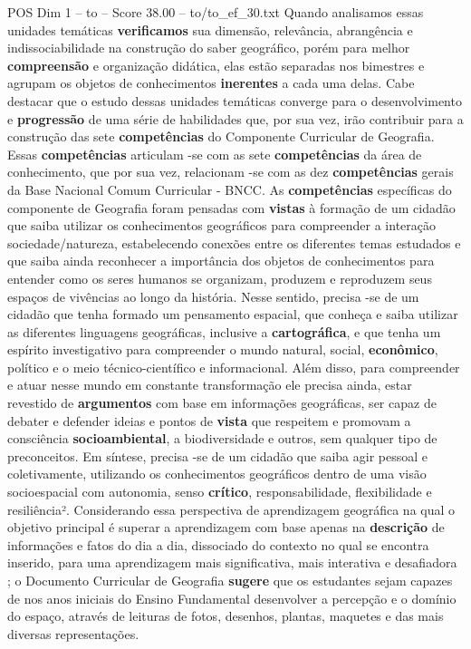 \begin{textsample}{POS Dim 1 – to – Score 38.00 – to/to\_ef\_30.txt}
Quando analisamos essas unidades temáticas \textbf{verificamos} sua dimensão, relevância, abrangência e indissociabilidade na construção do saber geográfico, porém para melhor \textbf{compreensão} e organização didática, elas estão separadas nos bimestres e agrupam os objetos de conhecimentos \textbf{inerentes} a cada uma delas.
Cabe destacar que o estudo dessas unidades temáticas converge para o desenvolvimento e \textbf{progressão} de uma série de habilidades que, por sua vez, irão contribuir para a construção das sete \textbf{competências} do Componente Curricular de Geografia.
Essas \textbf{competências} articulam -se com as sete \textbf{competências} da área de conhecimento, que por sua vez, relacionam -se com as dez \textbf{competências} gerais da Base Nacional Comum Curricular - BNCC.
As \textbf{competências} específicas do componente de Geografia foram pensadas com \textbf{vistas} à formação de um cidadão que saiba utilizar os conhecimentos geográficos para compreender a interação sociedade/natureza, estabelecendo conexões entre os diferentes temas estudados e que saiba ainda reconhecer a importância dos objetos de conhecimentos para entender como os seres humanos se organizam, produzem e reproduzem seus espaços de vivências ao longo da história.
Nesse sentido, precisa -se de um cidadão que tenha formado um pensamento espacial, que conheça e saiba utilizar as diferentes linguagens geográficas, inclusive a \textbf{cartográfica}, e que tenha um espírito investigativo para compreender o mundo natural, social, \textbf{econômico}, político e o meio técnico-científico e informacional.
Além disso, para compreender e atuar nesse mundo em constante transformação ele precisa ainda, estar revestido de \textbf{argumentos} com base em informações geográficas, ser capaz de debater e defender ideias e pontos de \textbf{vista} que respeitem e promovam a consciência \textbf{socioambiental}, a biodiversidade e outros, sem qualquer tipo de preconceitos.
Em síntese, precisa -se de um cidadão que saiba agir pessoal e coletivamente, utilizando os conhecimentos geográficos dentro de uma visão socioespacial com autonomia, senso \textbf{crítico}, responsabilidade, flexibilidade e resiliência².
Considerando essa perspectiva de aprendizagem geográfica na qual o objetivo principal é superar a aprendizagem com base apenas na \textbf{descrição} de informações e fatos do dia a dia, dissociado do contexto no qual se encontra inserido, para uma aprendizagem mais significativa, mais interativa e desafiadora ; o Documento Curricular de Geografia \textbf{sugere} que os estudantes sejam capazes de nos anos iniciais do Ensino Fundamental desenvolver a percepção e o domínio do espaço, através de leituras de fotos, desenhos, plantas, maquetes e das mais diversas representações.

\end{textsample}
